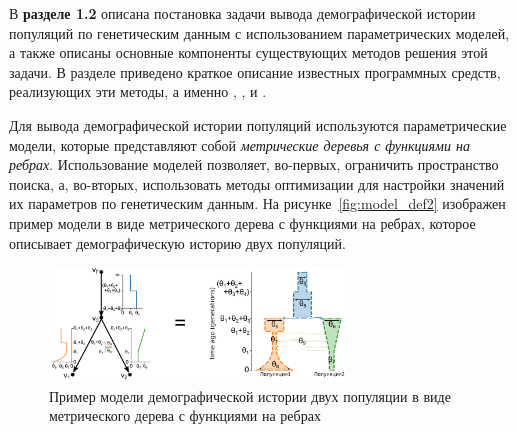 




\newpage
В \textbf{разделе 1.2} описана постановка задачи вывода демографической истории популяций по генетическим данным с использованием параметрических моделей, а также описаны основные компоненты существующих методов решения этой задачи.
В разделе приведено краткое описание известных программных средств, реализующих эти методы, а именно \dadi, \moments, \momi и \momentsLD.

Для вывода демографической истории популяций используются параметрические модели, которые представляют собой \textit{метрические деревья с функциями на ребрах}.
Использование моделей позволяет, во-первых, ограничить пространство поиска, а, во-вторых, использовать методы оптимизации для настройки значений их параметров по генетическим данным.
На рисунке~\ref{fig:model_def2} изображен пример модели в виде метрического дерева с функциями на ребрах, которое описывает демографическую историю двух популяций.

\begin{figure}[ht]
    \centering
    \includegraphics[width=0.7\textwidth]{images/part1/2d_model_metric_tree_2.pdf}
    \caption{Пример модели демографической истории двух популяции в виде метрического дерева с функциями на ребрах}
\end{figure}

